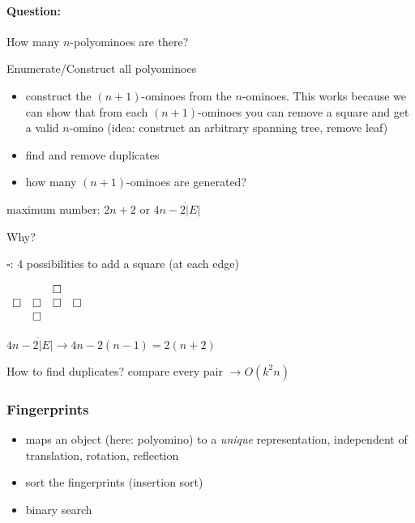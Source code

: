 \documentclass[11pt]{article}
\begin{document}
\paragraph{Question:} How many $ n $-polyominoes are there?


Enumerate/Construct all polyominoes
\begin{itemize}
\item construct the $ (n + 1) $-ominoes from the $ n $-ominoes. This works because we can show that from each $ (n + 1) $-ominoes you can remove a square and get a valid $ n $-omino (idea: construct an arbitrary spanning tree, remove leaf)
\item find and remove duplicates
\item how many $ (n + 1) $-ominoes are generated?
\end{itemize}

	maximum number:
	$ 2n + 2 $ or $ 4n - 2 \dot | E | $
	
	Why?
	
	$ \square $: 4 possibilities to add a square (at each edge)
	
	$\begin{array}{c c c c}
	& & \square \\
	\square & \square & \square & \square \\
	& \square
	\end{array} $
	
	$ 4n - 2 \dot | E | \rightarrow 4n - 2(n - 1) = 2(n + 2) $
	
	How to find duplicates? compare every pair $ \rightarrow O(k^2 n) $

\subsubsection{Fingerprints}

\begin{itemize}

\item maps an object (here: polyomino) to a \textit{unique} representation, independent of translation, rotation, reflection

\item sort the fingerprints (insertion sort)

\item binary search

\end{itemize}
\end{document}
